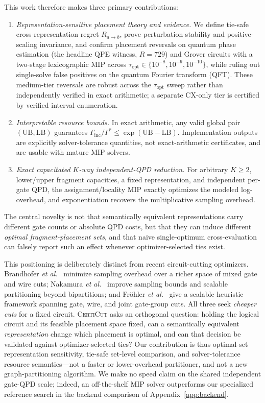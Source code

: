 \documentclass[
  aps,
  pra,
  reprint,
  amsmath,
  amssymb,
  longbibliography,
  nofootinbib,
  floatfix
]{revtex4-2}
\theoremstyle{plain}
\newcommand{\CertiCut}{\textsc{CertiCut}}
\newcommand{\LB}{\mathrm{LB}}
\newcommand{\UB}{\mathrm{UB}}
\begin{document}
This work therefore makes three primary contributions:
\begin{enumerate}
  \item \emph{Representation-sensitive placement theory and evidence.} We define tie-safe cross-representation regret $R_{a\to b}$, prove perturbation stability and positive-scaling invariance, and confirm placement reversals on quantum phase estimation (the headline QPE witness, $R=729$) and Grover circuits with a two-stage lexicographic MIP across $\tau_{\mathrm{opt}}\in\{10^{-8},10^{-9},10^{-10}\}$, while ruling out single-solve false positives on the quantum Fourier transform (QFT). These medium-tier reversals are robust across the $\tau_{\mathrm{opt}}$ sweep rather than independently verified in exact arithmetic; a separate CX-only tier is certified by verified interval enumeration.
  \item \emph{Interpretable resource bounds.} In exact arithmetic, any valid global pair $(\UB,\LB)$ guarantees $\Gamma_{\mathrm{inc}}/\Gamma^*\leq\exp(\UB-\LB)$. Implementation outputs are explicitly solver-tolerance quantities, not exact-arithmetic certificates, and are usable with mature MIP solvers.
  \item \emph{Exact capacitated $K$-way independent-QPD reduction.} For arbitrary $K\geq2$, lower/upper fragment capacities, a fixed representation, and independent per-gate QPD, the assignment/locality MIP exactly optimizes the modeled log-overhead, and exponentiation recovers the multiplicative sampling overhead.
\end{enumerate}
The central novelty is not that semantically equivalent representations carry different gate counts or absolute QPD costs, but that they can induce different \emph{optimal fragment-placement sets}, and that naive single-optimum cross-evaluation can falsely report such an effect whenever optimizer-selected ties exist.

This positioning is deliberately distinct from recent circuit-cutting optimizers. Brandhofer \emph{et al.}~\cite{brandhofer2024} minimize sampling overhead over a richer space of mixed gate and wire cuts; Nakamura \emph{et al.}~\cite{nakamura2025} improve sampling bounds and scalable partitioning beyond bipartitions; and Fr{\"o}hler \emph{et al.}~\cite{frohler2026} give a scalable heuristic framework spanning gate, wire, and joint gate-group cuts. All three seek \emph{cheaper cuts} for a fixed circuit. \CertiCut{} asks an orthogonal question: holding the logical circuit and its feasible placement space fixed, can a semantically equivalent \emph{representation} change which placement is optimal, and can that decision be validated against optimizer-selected ties? Our contribution is thus optimal-set representation sensitivity, tie-safe set-level comparison, and solver-tolerance resource semantics---not a faster or lower-overhead partitioner, and not a new graph-partitioning algorithm. We make no speed claim on the shared independent gate-QPD scale; indeed, an off-the-shelf MIP solver outperforms our specialized reference search in the backend comparison of Appendix~\ref{app:backend}.
\end{document}
